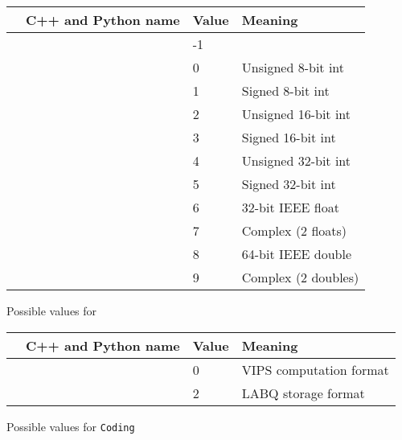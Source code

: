 \begin{tab2}
\begin{center}
\begin{tabular}{|l|l|l|l|}
\hline
\ct{BandFmt} 		    & C++ and Python name & Value & Meaning \\
\hline
\ct{IM\_BANDFMT\_NOTSET}    & \ct{FMTNOTSET}    & -1 & \\
\ct{IM\_BANDFMT\_UCHAR}     & \ct{FMTUCHAR}     & 0  & Unsigned 8-bit int \\
\ct{IM\_BANDFMT\_CHAR} 	    & \ct{FMTCHAR}      & 1  & Signed 8-bit int \\
\ct{IM\_BANDFMT\_USHORT}    & \ct{FMTUSHORT}    & 2  & Unsigned 16-bit int \\
\ct{IM\_BANDFMT\_SHORT}     & \ct{FMTSHORT}     & 3  & Signed 16-bit int \\
\ct{IM\_BANDFMT\_UINT} 	    & \ct{FMTUINT}      & 4  & Unsigned 32-bit int \\
\ct{IM\_BANDFMT\_INT} 	    & \ct{FMTINT}       & 5  & Signed 32-bit int \\
\ct{IM\_BANDFMT\_FLOAT}     & \ct{FMTFLOAT}     & 6  & 32-bit IEEE float \\
\ct{IM\_BANDFMT\_COMPLEX}   & \ct{FMTCOMPLEX}   & 7  & Complex (2 floats) \\
\ct{IM\_BANDFMT\_DOUBLE}    & \ct{FMTDOUBLE}    & 8  & 64-bit IEEE double \\
\ct{IM\_BANDFMT\_DPCOMPLEX} & \ct{FMTDPCOMPLEX} & 9  & Complex (2 doubles) \\
\hline
\end{tabular}
\end{center}
\caption{Possible values for \label{fg:bandfmt}}
\end{tab2}

\begin{tab2}
\begin{center}
\begin{tabular}{|l|l|l|l|}
\hline
\ct{Coding} & C++ and Python name & Value & Meaning \\
\hline
\ct{IM\_CODING\_NONE}  & \ct{NOCODING} & 0 & VIPS computation format \\
\ct{IM\_CODING\_LABQ}  & \ct{LABQ} & 2 & LABQ storage format \\
\hline
\end{tabular}
\end{center}
\caption{Possible values for \texttt{Coding}\label{fg:coding}}
\end{tab2}

